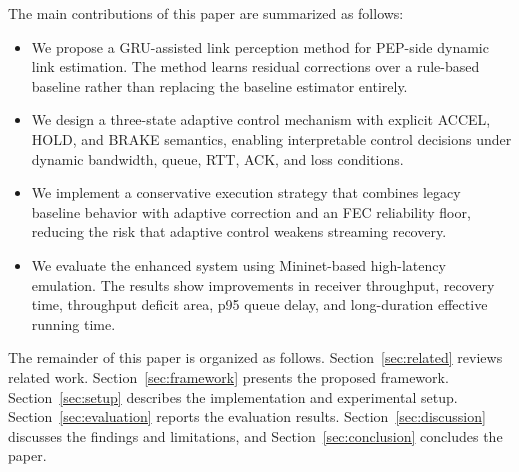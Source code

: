 The main contributions of this paper are summarized as follows:
\begin{itemize}
    \item We propose a GRU-assisted link perception method for PEP-side dynamic link estimation. The method learns residual corrections over a rule-based baseline rather than replacing the baseline estimator entirely.
    \item We design a three-state adaptive control mechanism with explicit ACCEL, HOLD, and BRAKE semantics, enabling interpretable control decisions under dynamic bandwidth, queue, RTT, ACK, and loss conditions.
    \item We implement a conservative execution strategy that combines legacy baseline behavior with adaptive correction and an FEC reliability floor, reducing the risk that adaptive control weakens streaming recovery.
    \item We evaluate the enhanced system using Mininet-based high-latency emulation. The results show improvements in receiver throughput, recovery time, throughput deficit area, p95 queue delay, and long-duration effective running time.
\end{itemize}

The remainder of this paper is organized as follows. Section~\ref{sec:related} reviews related work. Section~\ref{sec:framework} presents the proposed framework. Section~\ref{sec:setup} describes the implementation and experimental setup. Section~\ref{sec:evaluation} reports the evaluation results. Section~\ref{sec:discussion} discusses the findings and limitations, and Section~\ref{sec:conclusion} concludes the paper.
